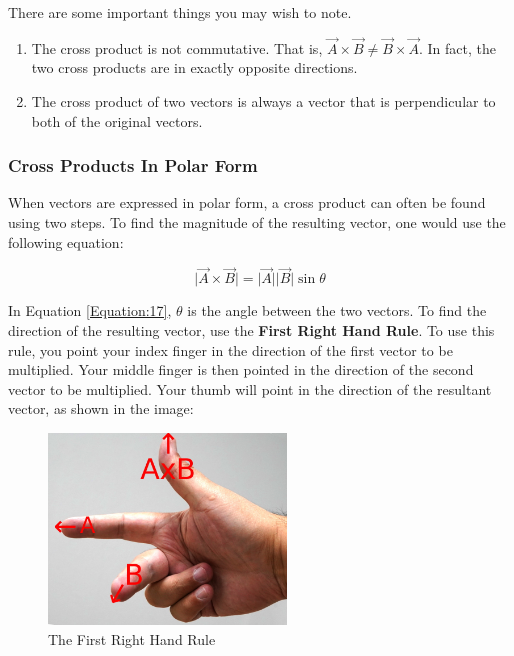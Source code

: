 	There are some important things you may wish to note.  
	\begin{enumerate}
		\item The cross product is not commutative.  That is, $\vec{A} \times \vec{B} \neq \vec{B} \times \vec{A}$.  In fact, the two cross products are in exactly opposite directions.  
		\item The cross product of two vectors is always a vector that is perpendicular to both of the original vectors.  
	\end{enumerate}


\subsubsection{Cross Products In Polar Form}
	When vectors are expressed in polar form, a cross product can often be found using two steps.  To find the magnitude of the resulting vector, one would use the following equation:
	
\begin{mdframed}[backgroundcolor=orange!20!white]
	\begin{equation}
	\lvert \vec{A} \times \vec{B} \rvert = 	\lvert \vec{A} \rvert \lvert\vec{B} \rvert \sin \theta
	\label{Equation:17}
	\end{equation}
\end{mdframed}	

In Equation \ref{Equation:17}, $\theta$ is the angle between the two vectors.  To find the direction of the resulting vector, use the \textbf{First Right Hand Rule}.    To use this rule, you point your index finger in the direction of the first vector to be multiplied.  Your middle finger is then pointed in the direction of the second vector to be multiplied.  Your thumb will point in the direction of the resultant vector, as shown in the image: 

\begin{center}
	\begin{figure}[h]
		\centering
	\includegraphics[height=2in]{./Chapters/Ch01-intro/righthandrule.JPG}	
	\caption{The First Right Hand Rule}
	\end{figure}
	
\end{center}

